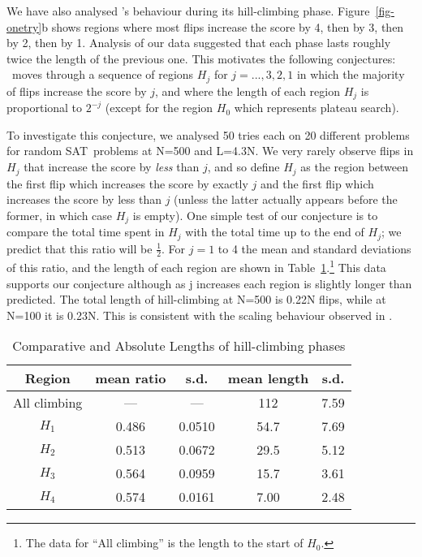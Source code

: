 \label{sec-hc}

We have also analysed \GSAT's behaviour during its
hill-climbing phase.  Figure~\ref{fig-onetry}b shows
regions where most
flips increase the score by 4, then by 3, then by 2, then by 1.  
Analysis of our data suggested  that each phase 
lasts roughly twice the length of the previous one.
This motivates the following conjectures:
\GSAT\ moves through a sequence of regions
$H_j$ for $j= ...,3,2,1$ in which the majority of flips 
increase the score by $j$, and where the length of each region
$H_j$ is proportional to $2^{-j}$ (except for the region $H_0$ which
represents plateau search). 

To investigate this conjecture, we analysed 
50 tries each on 20 different problems for random \3SAT\ problems
at N=500 and L=4.3N.
We very rarely observe flips
in $H_j$ that increase the score by {\em less} than $j$, 
and so {define} $H_j$ as the region
between the first flip which increases the score by exactly $j$ and the first
flip which increases
the score by less than $j$ (unless the latter actually appears
before the former, in which case $H_j$ is empty).   
One simple 
test of our conjecture is to compare the total time spent in
$H_j$ with the total time up to the end of $H_j$; 
we predict that this ratio will be $\frac{1}{2}$.  
For $j = 1$ to 4 the mean and standard deviations of 
this ratio, and the length of each region are shown in 
Table~\ref{table-hc}.\footnote{The data 
for ``All climbing'' is the length to the start of $H_0$.}
This data supports our conjecture although as j increases
each region is slightly longer than predicted.  
The total length of hill-climbing at N=500 is 0.22N flips,
while at N=100 it is 0.23N. This is consistent with the scaling
behaviour observed in . 
\begin{table}[htb]
\begin{center}
\begin{tabular}{|c|cc|cc|}
\hline
Region&mean ratio&s.d.&mean length&s.d. \\
\hline
All climbing&---&---&112&7.59\\
$H_1$&0.486&0.0510&54.7&7.69\\
$H_2$&0.513&0.0672&29.5&5.12\\
$H_3$&0.564&0.0959&15.7&3.61\\
$H_4$&0.574&0.0161&7.00&2.48\\\hline
\end{tabular}
\end{center}
\caption{Comparative and Absolute Lengths of hill-climbing phases}
\label{table-hc}
\end{table}

